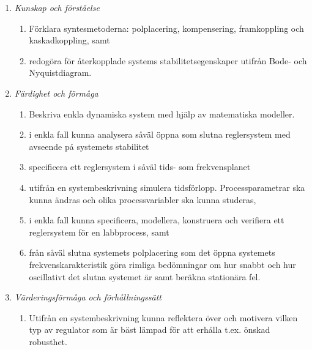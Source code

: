 \begin{enumerate}
\def\labelenumi{\Alph{enumi}.}
\tightlist
\item
  \emph{Kunskap och förståelse}

  \begin{enumerate}
  \def\labelenumii{\Alph{enumi}.\arabic{enumii}.}
  \tightlist
  \item
    Förklara syntesmetoderna: polplacering, kompensering, framkoppling
    och kaskadkoppling, samt
  \item
    redogöra för återkopplade systems stabilitetsegenskaper utifrån
    Bode- och Nyquistdiagram.
  \end{enumerate}
\item
  \emph{Färdighet och förmåga}

  \begin{enumerate}
  \def\labelenumii{\Alph{enumi}.\arabic{enumii}.}
  \tightlist
  \item
    Beskriva enkla dynamiska system med hjälp av matematiska modeller.
  \item
    i enkla fall kunna analysera såväl öppna som slutna reglersystem med
    avseende på systemets stabilitet
  \item
    specificera ett reglersystem i såväl tids- som frekvensplanet
  \item
    utifrån en systembeskrivning simulera tidsförlopp. Processparametrar
    ska kunna ändras och olika processvariabler ska kunna studeras,
  \item
    i enkla fall kunna specificera, modellera, konstruera och verifiera
    ett reglersystem för en labbprocess, samt
  \item
    från såväl slutna systemets polplacering som det öppna systemets
    frekvenskarakteristik göra rimliga bedömningar om hur snabbt och hur
    oscillativt det slutna systemet är samt beräkna stationära fel.
  \end{enumerate}
\item
  \emph{Värderingsförmåga och förhållningssätt}

  \begin{enumerate}
  \def\labelenumii{\Alph{enumi}.\arabic{enumii}.}
  \tightlist
  \item
    Utifrån en systembeskrivning kunna reflektera över och motivera
    vilken typ av regulator som är bäst lämpad för att erhålla t.ex.
    önskad robusthet.
  \end{enumerate}
\end{enumerate}


